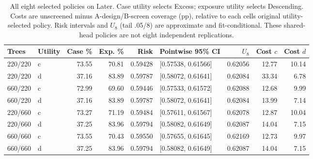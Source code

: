 \begin{table}[t]\centering\scriptsize
\caption{All eight selected policies on Later. Case utility selects Excess; exposure utility selects Descending. Costs are unscreened minus A-design/B-screen coverage (pp), relative to each cell\textquotesingle s original utility-selected policy. Risk intervals and $U_8$ (tail .05/8) are approximate and fit-conditional. These shared-head policies are not eight independent replications.}\label{tab:v7-cost}
\begin{tabular}{llrrrlrrr}\toprule
Trees & Utility & Case \% & Exp. \% & Risk & Pointwise 95\% CI & $U_8$ & Cost $c$ & Cost $d$\\\midrule
220/220 & c & 73.55 & 70.81 & 0.59428 & [0.57538, 0.61566] & 0.62056 & 12.77 & 10.14 \\
220/220 & d & 37.16 & 83.89 & 0.59787 & [0.58072, 0.61641] & 0.62084 & 33.34 & 6.78 \\
660/220 & c & 72.99 & 69.60 & 0.59446 & [0.57533, 0.61572] & 0.62088 & 12.68 & 9.99 \\
660/220 & d & 37.16 & 83.89 & 0.59787 & [0.58072, 0.61641] & 0.62084 & 13.99 & 7.14 \\
220/660 & c & 73.27 & 71.19 & 0.59484 & [0.57611, 0.61567] & 0.62078 & 12.87 & 10.04 \\
220/660 & d & 37.25 & 83.96 & 0.59794 & [0.58082, 0.61649] & 0.62087 & 14.04 & 7.15 \\
660/660 & c & 73.55 & 70.43 & 0.59550 & [0.57655, 0.61645] & 0.62169 & 12.73 & 9.97 \\
660/660 & d & 37.25 & 83.96 & 0.59794 & [0.58082, 0.61649] & 0.62087 & 14.04 & 7.15 \\
\bottomrule\end{tabular}\end{table}
